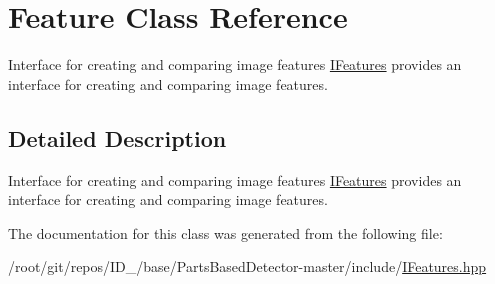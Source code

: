 \hypertarget{classFeature}{\section{\-Feature \-Class \-Reference}
\label{classFeature}
}


\-Interface for creating and comparing image features \hyperlink{classIFeatures}{\-I\-Features} provides an interface for creating and comparing image features.  




\subsection{\-Detailed \-Description}
\-Interface for creating and comparing image features \hyperlink{classIFeatures}{\-I\-Features} provides an interface for creating and comparing image features. 

\-The documentation for this class was generated from the following file\-:\begin{DoxyCompactItemize}
\item 
/root/git/repos/\-I\-D\-\_/base/\-Parts\-Based\-Detector-\/master/include/\hyperlink{IFeatures_8hpp}{\-I\-Features.\-hpp}\end{DoxyCompactItemize}
